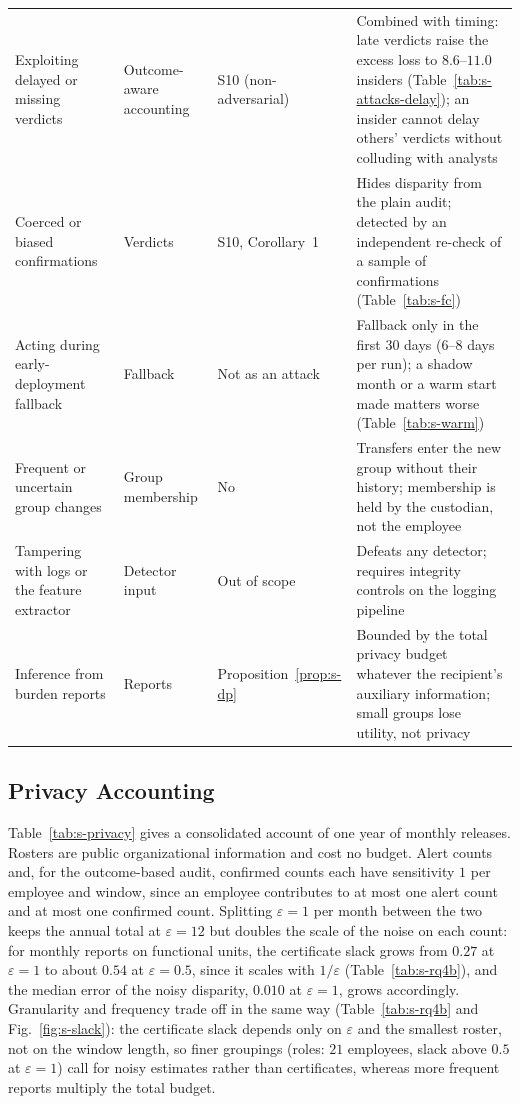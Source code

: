 \documentclass[10pt,onecolumn,letterpaper]{article}
\begin{document}
\begin{table}[!t]
\begin{tabular}{p{3.6cm}p{3.0cm}p{2.2cm}p{7.6cm}}
Exploiting delayed or missing verdicts & Outcome-aware accounting & S10 (non-adversarial) & Combined with timing: late verdicts raise the excess loss to $8.6$--$11.0$ insiders (Table~\ref{tab:s-attacks-delay}); an insider cannot delay others' verdicts without colluding with analysts \\
Coerced or biased confirmations & Verdicts & S10, Corollary~1 & Hides disparity from the plain audit; detected by an independent re-check of a sample of confirmations (Table~\ref{tab:s-fc}) \\
Acting during early-deployment fallback & Fallback & Not as an attack & Fallback only in the first $30$ days ($6$--$8$ days per run); a shadow month or a warm start made matters worse (Table~\ref{tab:s-warm}) \\
Frequent or uncertain group changes & Group membership & No & Transfers enter the new group without their history; membership is held by the custodian, not the employee \\
Tampering with logs or the feature extractor & Detector input & Out of scope & Defeats any detector; requires integrity controls on the logging pipeline \\
Inference from burden reports & Reports & Proposition~\ref{prop:s-dp} & Bounded by the total privacy budget whatever the recipient's auxiliary information; small groups lose utility, not privacy \\
\bottomrule
\end{tabular}
\end{table}

\subsection{Privacy Accounting}
Table~\ref{tab:s-privacy} gives a consolidated account of one year of monthly releases. Rosters are public organizational information and cost no budget. Alert counts and, for the outcome-based audit, confirmed counts each have sensitivity $1$ per employee and window, since an employee contributes to at most one alert count and at most one confirmed count. Splitting $\varepsilon=1$ per month between the two keeps the annual total at $\varepsilon=12$ but doubles the scale of the noise on each count: for monthly reports on functional units, the certificate slack grows from $0.27$ at $\varepsilon=1$ to about $0.54$ at $\varepsilon=0.5$, since it scales with $1/\varepsilon$ (Table~\ref{tab:s-rq4b}), and the median error of the noisy disparity, $0.010$ at $\varepsilon=1$, grows accordingly. Granularity and frequency trade off in the same way (Table~\ref{tab:s-rq4b} and Fig.~\ref{fig:s-slack}): the certificate slack depends only on $\varepsilon$ and the smallest roster, not on the window length, so finer groupings (roles: $21$ employees, slack above $0.5$ at $\varepsilon=1$) call for noisy estimates rather than certificates, whereas more frequent reports multiply the total budget.
\end{document}
